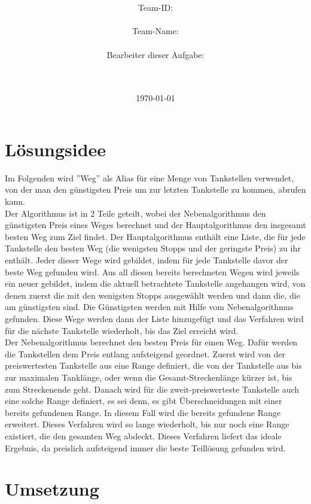 \documentclass[a4paper,10pt,ngerman]{scrartcl}
\title{\textbf{\Huge\Aufgabe}}
\author{\LARGE Team-ID: \LARGE \TeamID \\\\
	    \LARGE Team-Name: \LARGE \TeamName \\\\
	    \LARGE Bearbeiter dieser Aufgabe: \\ 
	    \LARGE \Namen\\\\}
\date{\LARGE\today}
\begin{document}
\maketitle
\tableofcontents

\vspace{0.5cm}

\section{Lösungsidee}
Im Folgenden wird ''Weg'' als Alias für eine Menge von Tankstellen verwendet, von der man den günstigsten Preis um zur letzten Tankstelle zu kommen, abrufen kann. \\
Der Algorithmus ist in 2 Teile geteilt, wobei der Nebenalgorithmus den günstigsten Preis eines Weges berechnet und der Hauptalgorithmus den insgesamt besten Weg zum Ziel findet.
Der Hauptalgorithmus enthält eine Liste, die für jede Tankstelle den besten Weg (die wenigsten Stopps und der geringste Preis) zu ihr enthält. Jeder dieser Wege wird gebildet, indem für jede Tankstelle davor der beste Weg gefunden wird. Aus all diesen bereits berechneten Wegen wird jeweils ein neuer gebildet, indem die aktuell betrachtete Tankstelle angehangen wird, von denen zuerst die mit den wenigsten Stopps ausgewählt werden und dann die, die am günstigsten sind. Die Günstigsten werden mit Hilfe vom Nebenalgorithmus gefunden. Diese Wege werden dann der Liste hinzugefügt und das Verfahren wird für die nächste Tankstelle wiederholt, bis das Ziel erreicht wird. \\
Der Nebenalgorithmus berechnet den besten Preis für einen Weg. Dafür werden die Tankstellen dem Preis entlang aufsteigend geordnet. Zuerst wird von der preiswertesten Tankstelle aus eine Range definiert, die von der Tankstelle aus bis zur maximalen Tanklänge, oder wenn die Gesamt-Streckenlänge kürzer ist, bis zum Streckenende geht. Danach wird für die zweit-preiswerteste Tankstelle auch eine solche Range definiert, es sei denn, es gibt Überschneidungen mit einer bereits gefundenen Range. In diesem Fall wird die bereits gefundene Range erweitert. Dieses Verfahren wird so lange wiederholt, bis nur noch eine Range existiert, die den gesamten Weg abdeckt. Dieses Verfahren liefert das ideale Ergebnis, da preislich aufsteigend immer die beste Teillösung gefunden wird. 
\newpage
\section{Umsetzung}
\end{document}

